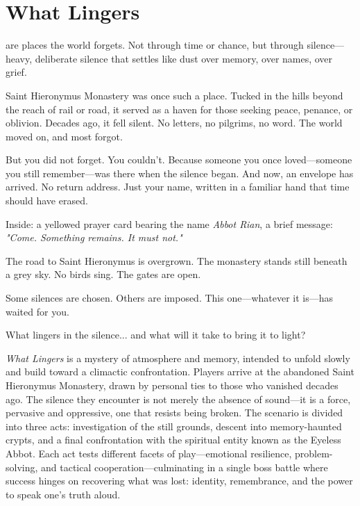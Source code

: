 \documentclass[nodeprecatedcode,bg=print]{dndbook/dndbook}
\begin{document}
\DndSetThemeColor[DmgSlateGray]
\twocolumn
\chapter*{What Lingers}
\begin{WyrdSettingHeading}
     are places the world forgets. Not through time or chance, but through silence—heavy, deliberate silence that settles like dust over memory, over names, over grief.

    \noindent
    Saint Hieronymus Monastery was once such a place. Tucked in the hills beyond the reach of rail or road, it served as a haven for those seeking peace, penance, or oblivion. Decades ago, it fell silent. No letters, no pilgrims, no word. The world moved on, and most forgot.

    But you did not forget. You couldn’t. Because someone you once loved—someone you still remember—was there when the silence began. And now, an envelope has arrived. No return address. Just your name, written in a familiar hand that time should have erased.

    Inside: a yellowed prayer card bearing the name \emph{Abbot Rian}, a brief message: \textit{"Come. Something remains. It must not."}

    The road to Saint Hieronymus is overgrown. The monastery stands still beneath a grey sky. No birds sing. The gates are open.

    Some silences are chosen. Others are imposed. This one—whatever it is—has waited for you.

    What lingers in the silence... and what will it take to bring it to light?
\end{WyrdSettingHeading}

\emph{What Lingers} is a mystery of atmosphere and memory, intended to unfold slowly and build toward a climactic confrontation. Players arrive at the abandoned Saint Hieronymus Monastery, drawn by personal ties to those who vanished decades ago. The silence they encounter is not merely the absence of sound—it is a force, pervasive and oppressive, one that resists being broken. The scenario is divided into three acts: investigation of the still grounds, descent into memory-haunted crypts, and a final confrontation with the spiritual entity known as the Eyeless Abbot. Each act tests different facets of play—emotional resilience, problem-solving, and tactical cooperation—culminating in a single boss battle where success hinges on recovering what was lost: identity, remembrance, and the power to speak one’s truth aloud.
\end{document}
